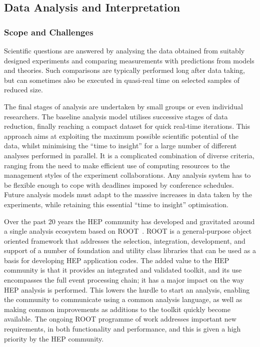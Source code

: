 \documentclass[twocolumn]{svjour3}          %
\begin{document}
\hypertarget{data-analysis-and-interpretation}{%
\subsection{Data Analysis and
Interpretation}\label{data-analysis-and-interpretation}}

\subsubsection*{Scope and Challenges}

Scientific questions are answered by analysing the data obtained from
suitably designed experiments and comparing measurements with
predictions from models and theories. Such comparisons are typically
performed long after data taking, but can sometimes also be executed in
quasi-real time on selected samples of reduced size.

The final stages of analysis are undertaken by small groups or even
individual researchers. The baseline analysis model utilises successive
stages of data reduction, finally reaching a compact dataset for quick
real-time iterations. This approach aims at exploiting the maximum
possible scientific potential of the data, whilst minimising the ``time
to insight'' for a large number of different analyses performed in
parallel. It is a complicated combination of diverse criteria, ranging
from the need to make efficient use of computing resources to the
management styles of the experiment collaborations. Any analysis system
has to be flexible enough to cope with deadlines imposed by conference
schedules. Future analysis models must adapt to the massive increases in
data taken by the experiments, while retaining this essential ``time to
insight'' optimisation.

Over the past 20 years the HEP community has developed and gravitated
around a single analysis ecosystem based on ROOT~\cite{Brun1996}. 
ROOT is a general-purpose object
oriented framework that addresses the selection, integration,
development, and support of a number of foundation and utility class
libraries that can be used as a basis for developing HEP application
codes. The added value to the HEP community is that it provides an
integrated and validated toolkit, and its use encompasses the full event
processing chain; it has a major impact on the way HEP analysis is
performed. This lowers the hurdle to start an analysis, enabling the
community to communicate using a common analysis language, as well as
making common improvements as additions to the toolkit quickly become
available. The ongoing ROOT programme of work addresses important new
requirements, in both functionality and performance, and this is given
a high priority by the HEP community.
\end{document}

